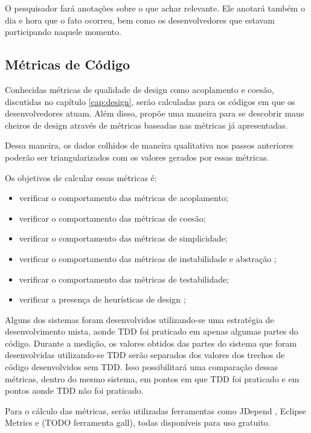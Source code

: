 O pesquisador fará anotações sobre o que achar relevante. Ele anotará também o dia e hora que o fato ocorreu, bem como os desenvolvedores
que estavam participando naquele momento.

\subsection{Métricas de Código}
\label{sec:planejamento-estrategia-metricas}

Conhecidas métricas de qualidade de design como acoplamento e coesão, discutidas no capítulo \ref{cap:design}, serão calculadas para os códigos em que os desenvolvedores
atuam. Além disso, \cite{lanza} propõe uma maneira para se descobrir maus cheiros de design através de métricas baseadas nas métricas
já apresentadas.

Dessa maneira, os dados colhidos de maneira qualitativa nos passos anteriores poderão ser triangularizados com os valores gerados
por essas métricas.

Os objetivos de calcular essas métricas é:

\begin{itemize}
	\item verificar o comportamento das métricas de acoplamento;
	\item verificar o comportamento das métricas de coesão;
	\item verificar o comportamento das métricas de simplicidade;
	\item verificar o comportamento das métricas de instabilidade e abstração \cite{bobmartin-oodmetrics};
	\item verificar o comportamento das métricas de testabilidade;
	\item verificar a presença de heurísticas de design \cite{lanza};
\end{itemize}

Alguns dos sistemas foram desenvolvidos utilizando-se uma estratégia de desenvolvimento mista, aonde TDD foi praticado em apenas algumas partes
do código. Durante a medição, os valores obtidos das partes do sistema que foram desenvolvidas utilizando-se TDD serão separados dos valores 
dos trechos de código desenvolvidos sem TDD. Isso possibilitará uma comparação dessas métricas, 
dentro do mesmo sistema, em pontos em que TDD foi praticado e em pontos aonde TDD não foi praticado.

Para o cálculo das métricas, serão utilizadas ferramentas como JDepend \cite{jdepend}, Eclipse Metrics \cite{eclipse-metrics} e (TODO ferramenta gall),
todas disponíveis para uso gratuito.

